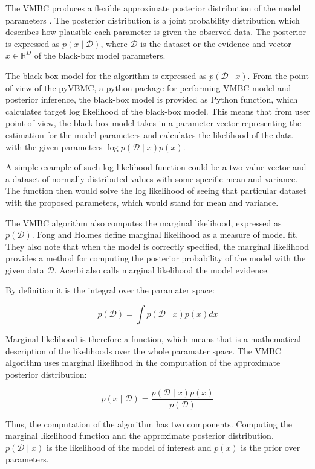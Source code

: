 \documentclass[english,oneside,openany]{UH_DS_report}
\begin{document}
The VMBC produces a flexible approximate posterior distribution of the model parameters 
\cite{acerbi2018}. The posterior distribution is a joint probability distribution which describes 
how plausible each parameter is given the observed data. The posterior is expressed as $p(x \mid \mathcal{D})$,
where $\mathcal{D}$ is the dataset or the evidence and vector $x \in \mathbb{R}^D$ of the black-box model parameters.


The black-box model for the algorithm is expressed as $p(\mathcal{D} \mid x)$\cite{acerbi2018}.
From the point of view of the pyVBMC, a python package for performing VMBC model 
and posterior inference, the black-box model is provided as Python function, 
which calculates target log likelihood of the black-box model\cite{pyvmbc}. This means 
that from user point of view, the black-box model takes in a parameter vector representing the estimation
for the model parameters and calculates the likelihood of the data with the given parameters $\log p(\mathcal{D} \mid x)p(x)$.

A simple example of such log likelihood function could be a two value vector and a dataset of normally
distributed values with some specific mean and variance. 
The function then would solve the log likelihood of seeing that particular dataset with the proposed parameters,
which would stand for mean and variance.

The VMBC algorithm also computes the marginal likelihood, expressed as $p(\mathcal{D})$\cite{acerbi2018}. 
Fong and Holmes define marginal likelihood as a measure of 
model fit\cite{holmes}. They also note that when the model is correctly specified, 
the marginal likelihood provides a method for computing the posterior probability of the model
with the given data $\mathcal{D}$. Acerbi also calls marginal likelihood the model evidence\cite{acerbi2018}.

By definition it is the integral over the paramater space:

$$
p(\mathcal{D})=\int p(\mathcal{D}\mid x)p(x)dx
$$

Marginal likelihood is therefore a function, which means that is a mathematical 
description of the likelihoods over the whole paramater space. The VMBC algorithm uses 
marginal likelihood in the computation of the approximate posterior distribution\cite{acerbi2018}: 

$$p(x\mid\mathcal{D}) = \frac{p(\mathcal{D}\mid x)p(x)}{p(\mathcal{D})}$$

Thus, the computation of the algorithm has two components. Computing the marginal likelihood function and the 
approximate posterior distribution. $p(\mathcal{D}\mid x)$ is the likelihood of the model of interest and $p(x)$
is the prior over parameters.\cite{acerbi2018}
\end{document}
